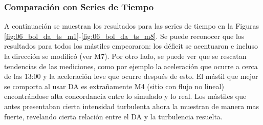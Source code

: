 \subsubsection{Comparación con Series de Tiempo}
A continuación se muestran los resultados para las series de tiempo en la Figuras \ref{fig:06_bol_da_ts_m1}-\ref{fig:06_bol_da_ts_m8}. Se puede reconocer que los resultados para todos los mástiles empeoraron: los déficit se acentuaron e incluso la dirección se modificó (ver M7). Por otro lado, se puede ver que se rescatan tendencias de las mediciones, como por ejemplo la aceleración que ocurre a cerca de las 13:00 y la aceleración leve que ocurre después de esto. El mástil que mejor se comporta al usar DA es extrañamente M4 (sitio con flujo no lineal) encontrándose alta concordancia entre lo simulado y lo real. Los mástiles que antes presentaban cierta intensidad turbulenta ahora la muestran de manera mas fuerte, revelando cierta relación entre el DA y la turbulencia resuelta.

